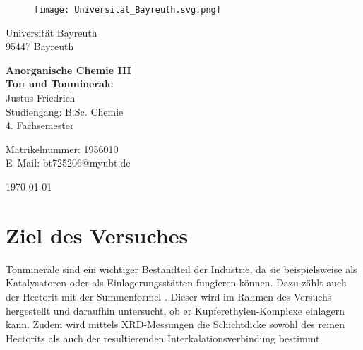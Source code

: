 \documentclass[12pt, a4paper]{article}
\begin{document}
\begin{figure}
    \texttt{[image: Universität\_Bayreuth.svg.png]}
\end{figure}



{\raggedright Universität Bayreuth\\  95447 Bayreuth}


\vspace{5cm}

\begin{center}
{\LARGE\bf{Anorganische Chemie III}} \\  
\vspace{1cm}
{\Large\bf{Ton und Tonminerale}}\\
\vspace{0.5cm}
{\large Justus Friedrich\\}
{Studiengang: B.Sc. Chemie\\}
{4. Fachsemester}
\end{center}





\thispagestyle{empty}
\begin{center}
{\small Matrikelnummer: 1956010 \\
E–Mail:  bt725206@myubt.de}
\end{center}

\vspace{5cm}

\begin{center}
  \today
\end{center}

\newpage
\tableofcontents
\thispagestyle{empty}


\newpage

\setcounter{page}{1}
\section{Ziel des Versuches}

Tonminerale sind ein wichtiger Bestandteil der Industrie, da sie beispielsweise als Katalysatoren oder als Einlagerungsstätten fungieren können. Dazu zählt auch der Hectorit mit der Summenformel \mbox{}. 
Dieser wird im Rahmen des Versuchs hergestellt und daraufhin untersucht, ob er Kupferethylen-Komplexe einlagern kann. Zudem wird mittels XRD-Messungen die Schichtdicke sowohl des reinen Hectorits als auch der resultierenden Interkalationsverbindung bestimmt. \cite{Skript}
\end{document}
